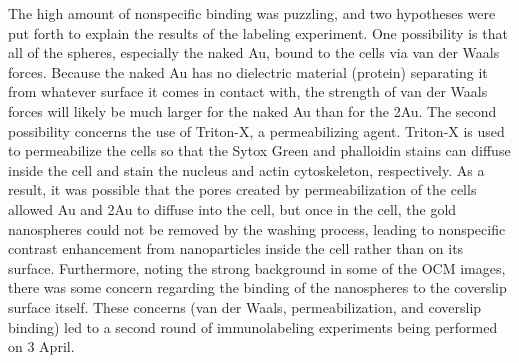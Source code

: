 The high amount of nonspecific binding was puzzling, and two hypotheses were put forth to explain the results of the labeling experiment. One possibility is that all of the spheres, especially the naked Au, bound to the cells via van der Waals forces. Because the naked Au has no dielectric material (protein) separating it from whatever surface it comes in contact with, the strength of van der Waals forces will likely be much larger for the naked Au than for the 2Au. The second possibility concerns the use of Triton-X, a permeabilizing agent. Triton-X is used to permeabilize the cells so that the Sytox Green and phalloidin stains can diffuse inside the cell and stain the nucleus and actin cytoskeleton, respectively. As a result, it was possible that the pores created by permeabilization of the cells allowed Au and 2Au to diffuse into the cell, but once in the cell, the gold nanospheres could not be removed by the washing process, leading to nonspecific contrast enhancement from nanoparticles inside the cell rather than on its surface. Furthermore, noting the strong background in some of the OCM images, there was some concern regarding the binding of the nanospheres to the coverslip surface itself. These concerns (van der Waals, permeabilization, and coverslip binding) led to a second round of immunolabeling experiments being performed on 3 April.